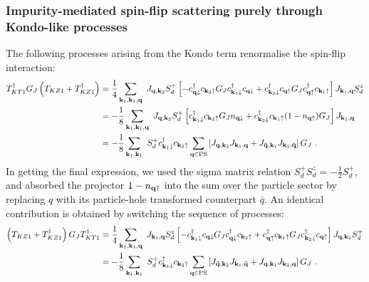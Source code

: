 \subsubsection*{Impurity-mediated spin-flip scattering purely through Kondo-like processes}
The following processes arising from the Kondo term renormalise the spin-flip interaction:
\begin{equation}\begin{aligned}\label{kondoRenorm1}
	T^\dagger_{KT1} G_J \left(T_{KZ1} + T_{KZ1}^\dagger\right) &= \frac{1}{4}\sum_{{\bf k}_1, {\bf k}_1, {\bf q}}~J_{{\bf q}, {\bf k}_2} S_d^+ \left[-c^\dagger_{{\bf q}\downarrow} c_{{\bf k}_2 \uparrow} G_J c^\dagger_{{\bf k}_1 \downarrow} c_{{\bf q} \downarrow} + c^\dagger_{{\bf k}_2\downarrow} c_{{\bf q} \uparrow} G_J c^\dagger_{{\bf q}\uparrow} c_{{\bf k}_1 \uparrow}\right]J_{{\bf k}_1,{\bf q}} S_d^z\\
								&= -\frac{1}{8}\sum_{{\bf k}_1, {\bf k}_1, {\bf q}}~J_{{\bf q}, {\bf k}_2} S_d^+ \left[ c^\dagger_{{\bf k}_1 \downarrow}c_{{\bf k}_2 \uparrow} G_J n_{{\bf q} \downarrow} + c^\dagger_{{\bf k}_2\downarrow} c_{{\bf k}_1 \uparrow}(1 - n_{{\bf q} \uparrow}) G_J \right]J_{{\bf k}_1,{\bf q}}\\
								&= -\frac{1}{8}\sum_{{\bf k}_1, {\bf k}_1}~ S_d^+ c^\dagger_{{\bf k}_1 \downarrow}c_{{\bf k}_2 \uparrow}\sum_{{\bf q} \in \text{PS}}\left[J_{{\bf q}, {\bf k}_2} J_{{\bf k}_1,{\bf q}} + J_{{\bf \bar q}, {\bf k}_1} J_{{\bf k}_2,{\bf \bar q}} \right]G_J~.
\end{aligned}\end{equation}
In getting the final expression, we used the sigma matrix relation \(S_d^+ S_d^z = -\frac{1}{2}S_d^+\), and absorbed the projector \(1 - n_{{\bf q} \uparrow}\) into the sum over the particle sector by replacing \(q\) with its particle-hole transformed counterpart \(\bar q\). An identical contribution is obtained by switching the sequence of processes:
\begin{equation}\begin{aligned}\label{kondoRenorm2}
	 \left(T_{KZ1} + T_{KZ1}^\dagger\right) G_J T^\dagger_{KT1} &= \frac{1}{4}\sum_{{\bf k}_1, {\bf k}_1, {\bf q}}~J_{{\bf k}_1,{\bf q}} S_d^z\left[- c^\dagger_{{\bf k}_1 \downarrow} c_{{\bf q} \downarrow}G_J c^\dagger_{{\bf q}\downarrow} c_{{\bf k}_2 \uparrow} +c^\dagger_{{\bf q}\uparrow} c_{{\bf k}_1 \uparrow} G_J c^\dagger_{{\bf k}_2\downarrow} c_{{\bf q} \uparrow} \right] J_{{\bf q}, {\bf k}_2} S_d^+ \\
								&= -\frac{1}{8}\sum_{{\bf k}_1, {\bf k}_1}~ S_d^+ c^\dagger_{{\bf k}_1 \downarrow}c_{{\bf k}_2 \uparrow}\sum_{{\bf q} \in \text{PS}}\left[J_{{\bf \bar q}, {\bf k}_2} J_{{\bf k}_1,{\bf \bar q}} + J_{{\bf q}, {\bf k}_1} J_{{\bf k}_2,{\bf q}} \right]G_J~.
\end{aligned}\end{equation}

